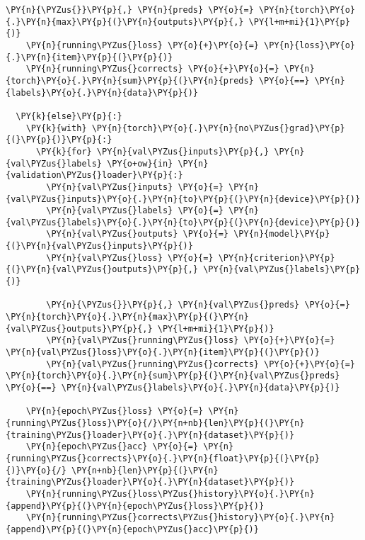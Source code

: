 \begin{tcolorbox}[breakable, size=fbox, boxrule=1pt, pad at break*=1mm,colback=cellbackground, colframe=cellborder]
\begin{Verbatim}[commandchars=\\\{\}]
    \PY{n}{\PYZus{}}\PY{p}{,} \PY{n}{preds} \PY{o}{=} \PY{n}{torch}\PY{o}{.}\PY{n}{max}\PY{p}{(}\PY{n}{outputs}\PY{p}{,} \PY{l+m+mi}{1}\PY{p}{)}
    \PY{n}{running\PYZus{}loss} \PY{o}{+}\PY{o}{=} \PY{n}{loss}\PY{o}{.}\PY{n}{item}\PY{p}{(}\PY{p}{)}
    \PY{n}{running\PYZus{}corrects} \PY{o}{+}\PY{o}{=} \PY{n}{torch}\PY{o}{.}\PY{n}{sum}\PY{p}{(}\PY{n}{preds} \PY{o}{==} \PY{n}{labels}\PY{o}{.}\PY{n}{data}\PY{p}{)}

  \PY{k}{else}\PY{p}{:}
    \PY{k}{with} \PY{n}{torch}\PY{o}{.}\PY{n}{no\PYZus{}grad}\PY{p}{(}\PY{p}{)}\PY{p}{:}
      \PY{k}{for} \PY{n}{val\PYZus{}inputs}\PY{p}{,} \PY{n}{val\PYZus{}labels} \PY{o+ow}{in} \PY{n}{validation\PYZus{}loader}\PY{p}{:}
        \PY{n}{val\PYZus{}inputs} \PY{o}{=} \PY{n}{val\PYZus{}inputs}\PY{o}{.}\PY{n}{to}\PY{p}{(}\PY{n}{device}\PY{p}{)}
        \PY{n}{val\PYZus{}labels} \PY{o}{=} \PY{n}{val\PYZus{}labels}\PY{o}{.}\PY{n}{to}\PY{p}{(}\PY{n}{device}\PY{p}{)}
        \PY{n}{val\PYZus{}outputs} \PY{o}{=} \PY{n}{model}\PY{p}{(}\PY{n}{val\PYZus{}inputs}\PY{p}{)}
        \PY{n}{val\PYZus{}loss} \PY{o}{=} \PY{n}{criterion}\PY{p}{(}\PY{n}{val\PYZus{}outputs}\PY{p}{,} \PY{n}{val\PYZus{}labels}\PY{p}{)}
        
        \PY{n}{\PYZus{}}\PY{p}{,} \PY{n}{val\PYZus{}preds} \PY{o}{=} \PY{n}{torch}\PY{o}{.}\PY{n}{max}\PY{p}{(}\PY{n}{val\PYZus{}outputs}\PY{p}{,} \PY{l+m+mi}{1}\PY{p}{)}
        \PY{n}{val\PYZus{}running\PYZus{}loss} \PY{o}{+}\PY{o}{=} \PY{n}{val\PYZus{}loss}\PY{o}{.}\PY{n}{item}\PY{p}{(}\PY{p}{)}
        \PY{n}{val\PYZus{}running\PYZus{}corrects} \PY{o}{+}\PY{o}{=} \PY{n}{torch}\PY{o}{.}\PY{n}{sum}\PY{p}{(}\PY{n}{val\PYZus{}preds} \PY{o}{==} \PY{n}{val\PYZus{}labels}\PY{o}{.}\PY{n}{data}\PY{p}{)}
      
    \PY{n}{epoch\PYZus{}loss} \PY{o}{=} \PY{n}{running\PYZus{}loss}\PY{o}{/}\PY{n+nb}{len}\PY{p}{(}\PY{n}{training\PYZus{}loader}\PY{o}{.}\PY{n}{dataset}\PY{p}{)}
    \PY{n}{epoch\PYZus{}acc} \PY{o}{=} \PY{n}{running\PYZus{}corrects}\PY{o}{.}\PY{n}{float}\PY{p}{(}\PY{p}{)}\PY{o}{/} \PY{n+nb}{len}\PY{p}{(}\PY{n}{training\PYZus{}loader}\PY{o}{.}\PY{n}{dataset}\PY{p}{)}
    \PY{n}{running\PYZus{}loss\PYZus{}history}\PY{o}{.}\PY{n}{append}\PY{p}{(}\PY{n}{epoch\PYZus{}loss}\PY{p}{)}
    \PY{n}{running\PYZus{}corrects\PYZus{}history}\PY{o}{.}\PY{n}{append}\PY{p}{(}\PY{n}{epoch\PYZus{}acc}\PY{p}{)}
    

\end{Verbatim}
\end{tcolorbox}
